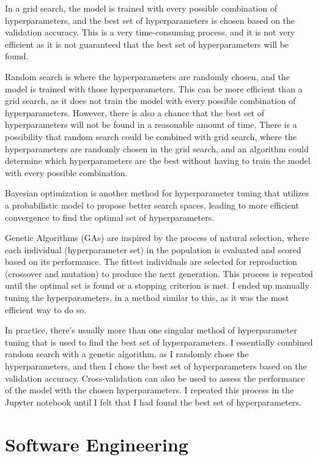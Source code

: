 \documentclass[]{final_report}
\begin{document}
In a grid search, the model is trained with every possible combination of hyperparameters, and the best set of hyperparameters is chosen based on the validation accuracy. This is a very time-consuming process, and it is not very efficient as it is not guaranteed that the best set of hyperparameters will be found.

Random search is where the hyperparameters are randomly chosen, and the model is trained with those hyperparameters. This can be more efficient than a grid search, as it does not train the model with every possible combination of hyperparameters. However, there is also a chance that the best set of hyperparameters will not be found in a reasonable amount of time. There is a possibility that random search could be combined with grid search, where the hyperparameters are randomly chosen in the grid search, and an algorithm could determine which hyperparameters are the best without having to train the model with every possible combination.

Bayesian optimization is another method for hyperparameter tuning that utilizes a probabilistic model to propose better search spaces, leading to more efficient convergence to find the optimal set of hyperparameters.

Genetic Algorithms (GAs) are inspired by the process of natural selection, where each individual (hyperparameter set) in the population is evaluated and scored based on its performance. The fittest individuals are selected for reproduction (crossover and mutation) to produce the next generation. This process is repeated until the optimal set is found or a stopping criterion is met. I ended up manually tuning the hyperparameters, in a method similar to this, as it was the most efficient way to do so.

In practice, there's usually more than one singular method of hyperparameter tuning that is used to find the best set of hyperparameters. I essentially combined random search with a genetic algorithm, as I randomly chose the hyperparameters, and then I chose the best set of hyperparameters based on the validation accuracy. Cross-validation can also be used to assess the performance of the model with the chosen hyperparameters. I repeated this process in the Jupyter notebook until I felt that I had found the best set of hyperparameters.


\chapter{Software Engineering}
\end{document}
